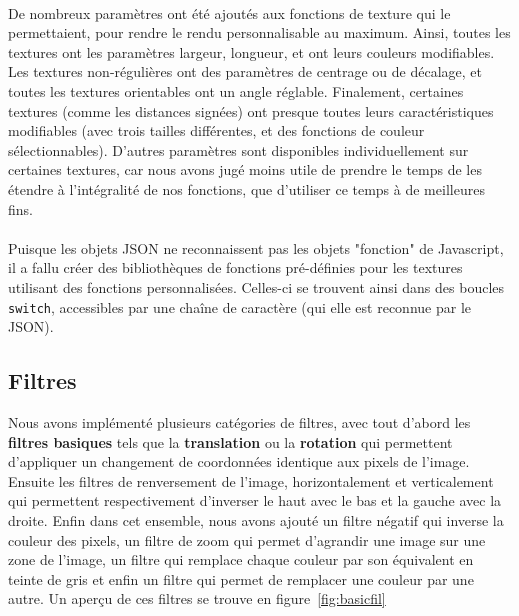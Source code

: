 \documentclass[a4paper]{article}
\begin{document}
\paragraph{}
De nombreux paramètres ont été ajoutés aux fonctions de texture qui le permettaient, pour rendre le rendu personnalisable au maximum. Ainsi, toutes les textures ont les paramètres largeur, longueur, et ont leurs couleurs modifiables. Les textures non-régulières ont des paramètres de centrage ou de décalage, et toutes les textures orientables ont un angle réglable. Finalement, certaines textures (comme les distances signées) ont presque toutes leurs caractéristiques modifiables (avec trois tailles différentes, et des fonctions de couleur sélectionnables). D'autres paramètres sont disponibles individuellement sur certaines textures, car nous avons jugé moins utile de prendre le temps de les étendre à l'intégralité de nos fonctions, que d'utiliser ce temps à de meilleures fins.

\paragraph{}
Puisque les objets JSON ne reconnaissent pas les objets "fonction" de Javascript, il a fallu créer des bibliothèques de fonctions pré-définies pour les textures utilisant des fonctions personnalisées. Celles-ci se trouvent ainsi dans des boucles \texttt{switch}, accessibles par une chaîne de caractère (qui elle est reconnue par le JSON).

\subsection{Filtres}
\label{sec:filters}

Nous avons implémenté plusieurs catégories de filtres, avec tout d'abord les \textbf{filtres basiques} tels que la \textbf{translation} ou la \textbf{rotation} qui permettent d'appliquer un changement de coordonnées identique aux pixels de l'image. Ensuite les filtres de renversement de l'image, horizontalement et verticalement qui permettent respectivement d'inverser le haut avec le bas et la gauche avec la droite. Enfin dans cet ensemble, nous avons ajouté un filtre négatif qui inverse la couleur des pixels, un filtre de zoom qui permet d'agrandir une image sur une zone de l'image, un filtre qui remplace chaque couleur par son équivalent en teinte de gris et enfin un filtre qui permet de remplacer une couleur par une autre. Un aperçu de ces filtres se trouve en figure~\ref{fig:basicfil}
\end{document}
